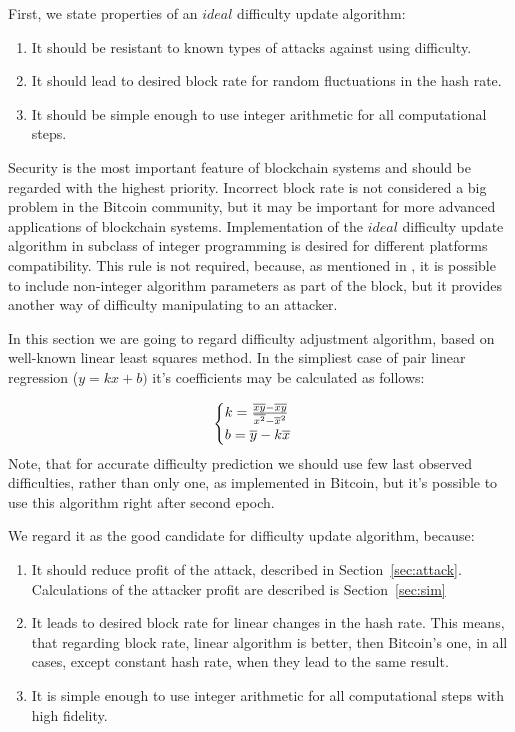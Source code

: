 \documentclass[number,preprint,review]{elsarticle}
\begin{document}
First, we state properties of an \(ideal\) difficulty update algorithm:
\begin{enumerate}
\item{It should be resistant to known types of attacks against using difficulty.}
\item{It should lead to desired block rate for random fluctuations in the hash rate.}
\item{It should be simple enough to use integer arithmetic for all computational steps.}
\end{enumerate}
Security is the most important feature of blockchain systems and should be regarded with the highest priority.
Incorrect block rate is not considered a big problem in the Bitcoin community, but it may be important for more advanced applications of blockchain systems.
Implementation of the \(ideal\) difficulty update algorithm in subclass of integer programming is desired for different platforms compatibility.
This rule is not required, because, as mentioned in \cite{kraft2015difficulty}, it is possible to include non-integer algorithm parameters as part of the block, but it provides another way of difficulty manipulating to an attacker.

In this section we are going to regard difficulty adjustment algorithm, based on well-known linear least squares method\cite{lawson1974solving}.
In the simpliest case of pair linear regression (\(y=kx+b)\) it's coefficients may be calculated as follows:

\begin{equation}
  \begin{cases}
    k= {{\overline{xy} - \overline{x}\overline{y}} \over {\overline{x^2} - \overline{x}^2}}  \\
    b=\overline{y}-k\overline{x}
  \end{cases}
\end{equation}
Note, that for accurate difficulty prediction we should use few last observed difficulties, rather than only one, as implemented in Bitcoin, but it's possible to use this algorithm right after second epoch.


We regard it as the good candidate for difficulty update algorithm, because:
\begin{enumerate}
\item{It should reduce profit of the attack, described in Section~\ref{sec:attack}.
Calculations of the attacker profit are described is Section~\ref{sec:sim}}
\item{It leads to desired block rate for linear changes in the hash rate.
This means, that regarding block rate, linear algorithm is better, then Bitcoin's one, in all cases, except constant hash rate, when they lead to the same result. }
\item{It is simple enough to use integer arithmetic for all computational steps with high fidelity.}
\end{enumerate}
\end{document}
